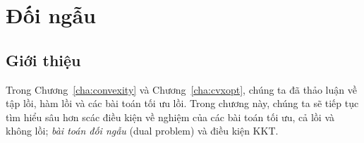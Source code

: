 \chapter{Đối ngẫu}
\label{cha:duality}




\section{Giới thiệu }
Trong Chương~\ref{cha:convexity} và Chương~\ref{cha:cvxopt}, chúng ta đã
thảo luận về tập lồi, hàm lồi và các bài toán tối ưu lồi. Trong chương này, chúng ta sẽ tiếp tục
tìm hiểu sâu hơn scác điều kiện về nghiệm của các bài toán tối ưu, cả
lồi và không lồi; \textit{bài toán đối ngẫu} ({dual problem}) và điều
kiện KKT.



